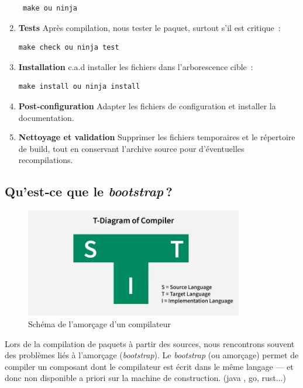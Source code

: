 \begin{enumerate}
\begin{verbatim}
 make ou ninja
    \end{verbatim}

  \item \textbf{Tests}  
    Après compilation, nous tester le paquet, surtout s’il est critique :
    \begin{verbatim}
make check ou ninja test
    \end{verbatim}

  \item \textbf{Installation}  
   c.a.d installer les fichiers dans l’arborescence cible :
    \begin{verbatim}
make install ou ninja install
    \end{verbatim}

  \item \textbf{Post‑configuration}  
     Adapter les fichiers de configuration et installer la documentation.

  \item \textbf{Nettoyage et validation}  
    Supprimer les fichiers temporaires et le répertoire de build, tout en conservant l’archive source pour d’éventuelles recompilations.
\end{enumerate}
\clearpage
\subsection{Qu’est‑ce que le \emph{bootstrap} ?}
\label{subsec:bootstrap}
\begin{figure}[H]
  \centering
  \includegraphics[width=0.85\textwidth]{images_pfe/bootstrap.png}
  \caption{Schéma de l’amorçage d’un compilateur}
  \label{fig:bootstrap}
\end{figure}

Lors de la compilation de paquets à partir des sources, nous rencontrons souvent des problèmes liés à l’amorçage (\emph{bootstrap}).  
Le \emph{bootstrap} (ou amorçage) permet de compiler un composant dont le compilateur est écrit dans le même langage — et donc non disponible a priori sur la machine de construction. (java , go, rust...)

